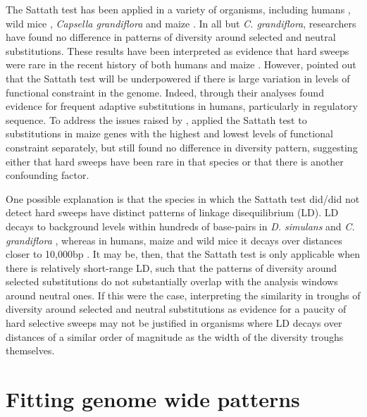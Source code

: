 The Sattath test has been applied in a variety of organisms, including humans \citep{RN162}, wild mice \citep{RN122}, \textit{Capsella grandiflora} \citep{RN236} and maize \citep{RN230}. In all but \textit{C. grandiflora}, researchers have found no difference in patterns of diversity around selected and neutral substitutions. These results have been interpreted as evidence that hard sweeps were rare in the recent history of both humans \citep{RN162} and maize \citep{RN230}. However, \cite{RN237} pointed out that the Sattath test will be underpowered if there is large variation in levels of functional constraint in the genome. Indeed, through their analyses \cite{RN237} found evidence for frequent adaptive substitutions in humans, particularly in regulatory sequence. To address the issues raised by \cite{RN237}, \cite{RN230} applied the Sattath test to substitutions in maize genes with the highest and lowest levels of functional constraint separately, but still found no difference in diversity pattern, suggesting either that hard sweeps have been rare in that species or that there is another confounding factor.
 
One possible explanation is that the species in which the Sattath test did/did not detect hard sweeps have distinct patterns of linkage disequilibrium (LD). LD decays to background levels within hundreds of base-pairs in \textit{D. simulans} \citep{RN283} and \textit{C. grandiflora} \citep{RN271}, whereas in humans, maize and wild mice it decays over distances closer to 10,000bp \citep{RN273,RN327, RN272}. It may be, then, that the Sattath test is only applicable when there is relatively short-range LD, such that the patterns of diversity around selected substitutions do not substantially overlap with the analysis windows around neutral ones. If this were the case, interpreting the similarity in troughs of diversity around selected and neutral substitutions as evidence for a paucity of hard selective sweeps may not be justified in organisms where LD decays over distances of a similar order of magnitude as the width of the diversity troughs themselves.
   	        	  
\section[Fitting genome wide patterns]{Fitting genome wide patterns}

